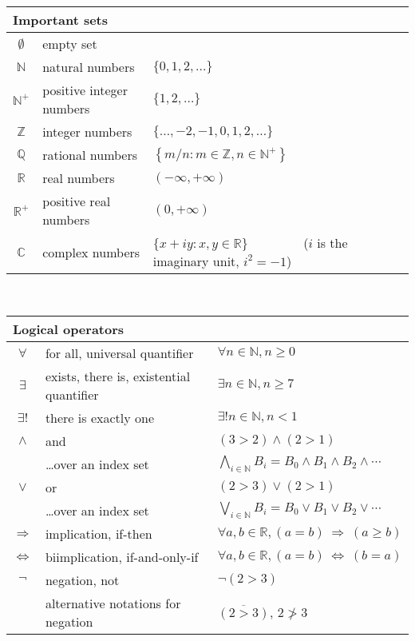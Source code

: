 \documentclass[11pt]{article}
\newcommand{\Reals}{\mathbb{R}}      %
\newcommand{\Naturals}{\mathbb{N}}   %
\newcommand{\Integers}{\mathbb{Z}}   %
\newcommand{\Rationals}{\mathbb{Q}}  %
\newcommand{\Complexes}{\mathbb{C}}  %
\newcommand{\IFF}{\mbox{$\Longleftrightarrow$}}    %
\newcommand{\THEN}{\mbox{$\Rightarrow$}}           %
\begin{document}
\begin{tabular}{|cll|}
\multicolumn{3}{l}{\bf Important sets}
\\ \hline
$\emptyset$ & empty set &
\\ \hline
$\Naturals$ & natural numbers & $\{0,1,2,\ldots\}$
\\ \hline
$\Naturals^+$ & positive integer numbers & $\{1,2,\ldots\}$
\\ \hline
$\Integers$ & integer numbers & $\{\ldots, -2,-1,0,1,2,\ldots\}$
\\ \hline
$\Rationals$ & rational numbers & $\left\{m/n : m \in \Integers,
n \in \Naturals^+ \right \}$
\\ \hline
$\Reals$ & real numbers & $(-\infty, +\infty)$
\\ \hline
$\Reals^+$ & positive real numbers & $(0, +\infty)$
\\ \hline
$\Complexes$ & complex numbers & $\{x+iy : x,y \in \Reals\}$
 ~~~~~~~~($i$ is the imaginary unit, $i^2=-1$)
\\ \hline
\end{tabular}\\

\begin{tabular}{|cll|}
\multicolumn{3}{l}{\bf Logical operators}
\\ \hline
$\forall$ & for all, universal quantifier & $\forall n\in\Naturals, n\geq 0$
\\ \hline
$\exists$ & exists, there is, existential quantifier &
   $\exists n\in\Naturals, n\geq 7$
\\ \hline
$\exists!$ & there is exactly one & $\exists! n\in\Naturals, n < 1$
\\ \hline
$\wedge$ & and & $(3>2) \wedge (2>1)$
\\ \hline
       & \ldots over an index set & $\bigwedge_{i\in \Naturals}
                B_i = B_0 \wedge B_1 \wedge B_2 \wedge \cdots$
\\ \hline
$\vee$ & or & $(2>3) \vee (2>1)$
\\ \hline
       & \ldots over an index set & $\bigvee_{i\in \Naturals}
                B_i = B_0 \vee B_1 \vee B_2 \vee \cdots$
\\ \hline
$\THEN$ & implication, if-then & $\forall a,b \in \Reals,
   (a = b) ~\THEN~ (a \geq b)$
\\ \hline
$\IFF$ & biimplication, if-and-only-if & $\forall a,b \in \Reals,
   (a = b) ~\IFF~ (b = a)$
\\ \hline
$\neg$ & negation, not & $\neg ( 2 > 3)$
\\ \hline
       & alternative notations for negation
       & $\overline{(2 > 3)}$, $2 \not> 3$
\\ \hline
\end{tabular}
\end{document}
